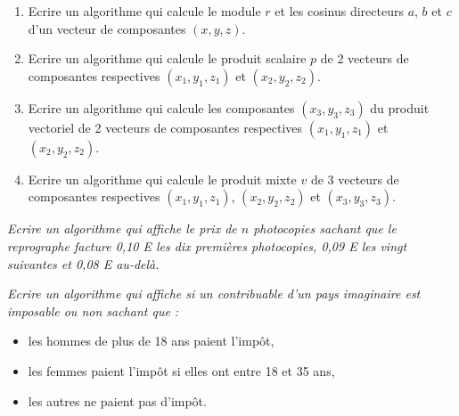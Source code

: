 \begin{td}\label{td:vecteurs}\em {}
\begin{enumerate}
\item Ecrire un algorithme qui calcule le module $r$ et les cosinus directeurs $a$, $b$ et $c$
	d'un vecteur de composantes $(x,y,z)$.
\item Ecrire un algorithme qui calcule le produit scalaire $p$ de 2 vecteurs de composantes
	respectives $(x_1,y_1,z_1)$ et $(x_2,y_2,z_2)$.
\item Ecrire un algorithme qui calcule les composantes $(x_3,y_3,z_3)$ du produit vectoriel
	de 2 vecteurs de composantes respectives $(x_1,y_1,z_1)$ et $(x_2,y_2,z_2)$.
\item Ecrire un algorithme qui calcule le produit mixte $v$ de 3 vecteurs de composantes
	respectives $(x_1,y_1,z_1)$, $(x_2,y_2,z_2)$ et $(x_3,y_3,z_3)$.
\end{enumerate}
\end{td}

\begin{td}\label{td:photocopie}\em {}
Ecrire un algorithme qui affiche le prix de $n$ photocopies sachant que
	le reprographe facture 0,10 E les dix premières photocopies, 0,09 E 
	les vingt suivantes et 0,08 E au-delà.
\end{td} 

\begin{td}\label{td:impot}\em {}
Ecrire un algorithme qui affiche si un contribuable d'un pays imaginaire
	est imposable ou non sachant que :
	\begin{itemize}
	\item les hommes de plus de 18 ans paient l'impôt,
    	\item les femmes paient l'impôt si elles ont entre 18 et 35 ans,
	\item les autres ne paient pas d'impôt.
	\end{itemize}
\end{td}


